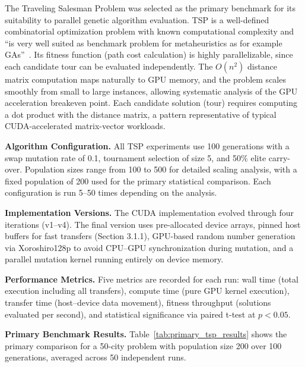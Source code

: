 


The Traveling Salesman Problem was selected as the primary benchmark for its suitability to parallel genetic algorithm evaluation. TSP is a well-defined combinatorial optimization problem with known computational complexity and ``is very well suited as benchmark problem for metaheuristics as for example GAs''~\cite{affenzeller2009genetic}. Its fitness function (path cost calculation) is highly parallelizable, since each candidate tour can be evaluated independently. The $O(n^2)$ distance matrix computation maps naturally to GPU memory, and the problem scales smoothly from small to large instances, allowing systematic analysis of the GPU acceleration breakeven point. Each candidate solution (tour) requires computing a dot product with the distance matrix, a pattern representative of typical CUDA-accelerated matrix-vector workloads.

\textbf{Algorithm Configuration.} All TSP experiments use 100 generations with a swap mutation rate of 0.1, tournament selection of size 5, and 50\% elite carry-over. Population sizes range from 100 to 500 for detailed scaling analysis, with a fixed population of 200 used for the primary statistical comparison. Each configuration is run 5--50 times depending on the analysis.

\textbf{Implementation Versions.} The CUDA implementation evolved through four iterations (v1--v4). The final version uses pre-allocated device arrays, pinned host buffers for fast transfers (Section 3.1.1), GPU-based random number generation via Xoroshiro128p to avoid CPU--GPU synchronization during mutation, and a parallel mutation kernel running entirely on device memory.

\textbf{Performance Metrics.} Five metrics are recorded for each run: wall time (total execution including all transfers), compute time (pure GPU kernel execution), transfer time (host--device data movement), fitness throughput (solutions evaluated per second), and statistical significance via paired t-test at $p < 0.05$.


\textbf{Primary Benchmark Results.} Table~\ref{tab:primary_tsp_results} shows the primary comparison for a 50-city problem with population size 200 over 100 generations, averaged across 50 independent runs.

